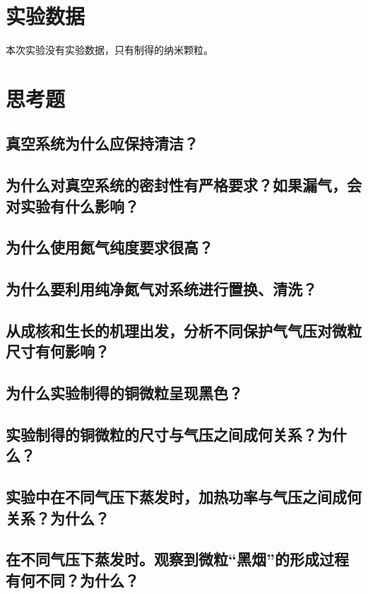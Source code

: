 \documentclass[a4paper]{article}
\begin{document}
\section{实验数据}
本次实验没有实验数据，只有制得的纳米颗粒。

\section{思考题}
\subsection{真空系统为什么应保持清洁？}
\subsection{为什么对真空系统的密封性有严格要求？如果漏气，会对实验有什么影响？}
\subsection{为什么使用氮气纯度要求很高？}
\subsection{为什么要利用纯净氮气对系统进行置换、清洗？}
\subsection{从成核和生长的机理出发，分析不同保护气气压对微粒尺寸有何影响？}\label{section8.5}
\subsection{为什么实验制得的铜微粒呈现黑色？}
\subsection{实验制得的铜微粒的尺寸与气压之间成何关系？为什么？}
\subsection{实验中在不同气压下蒸发时，加热功率与气压之间成何关系？为什么？}
\subsection{在不同气压下蒸发时。观察到微粒“黑烟”的形成过程有何不同？为什么？}

\nocite{jiaocai}

\end{document}

